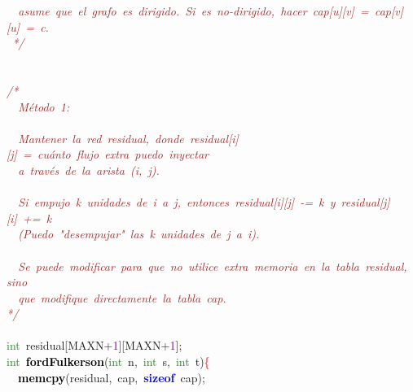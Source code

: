 {{\mbox{}\textit{\textcolor{Brown}{\ \ asume\ que\ el\ grafo\ es\ dirigido.\ Si\ es\ no-dirigido,\ hacer\ cap[u][v]\ =\ cap[v][u]\ =\ c.}} \\
\mbox{}\textit{\textcolor{Brown}{\ */}} \\
\mbox{} \\
\mbox{} \\
\mbox{}\textit{\textcolor{Brown}{/*}} \\
\mbox{}\textit{\textcolor{Brown}{\ \ Método\ 1:}} \\
\mbox{} \\
\mbox{}\textit{\textcolor{Brown}{\ \ Mantener\ la\ red\ residual,\ donde\ residual[i][j]\ =\ cuánto\ flujo\ extra\ puedo\ inyectar}} \\
\mbox{}\textit{\textcolor{Brown}{\ \ a\ través\ de\ la\ arista\ (i,\ j).}} \\
\mbox{} \\
\mbox{}\textit{\textcolor{Brown}{\ \ Si\ empujo\ k\ unidades\ de\ i\ a\ j,\ entonces\ residual[i][j]\ -=\ k\ y\ residual[j][i]\ +=\ k}} \\
\mbox{}\textit{\textcolor{Brown}{\ \ (Puedo\ "{}desempujar"{}\ las\ k\ unidades\ de\ j\ a\ i).}} \\
\mbox{} \\
\mbox{}\textit{\textcolor{Brown}{\ \ Se\ puede\ modificar\ para\ que\ no\ utilice\ extra\ memoria\ en\ la\ tabla\ residual,\ sino}} \\
\mbox{}\textit{\textcolor{Brown}{\ \ que\ modifique\ directamente\ la\ tabla\ cap.}} \\
\mbox{}\textit{\textcolor{Brown}{*/}} \\
\mbox{} \\
\mbox{}\textcolor{ForestGreen}{int}\ residual\textcolor{BrickRed}{[}MAXN\textcolor{BrickRed}{+}\textcolor{Purple}{1}\textcolor{BrickRed}{][}MAXN\textcolor{BrickRed}{+}\textcolor{Purple}{1}\textcolor{BrickRed}{];} \\
\mbox{}\textcolor{ForestGreen}{int}\ \textbf{\textcolor{Black}{fordFulkerson}}\textcolor{BrickRed}{(}\textcolor{ForestGreen}{int}\ n\textcolor{BrickRed}{,}\ \textcolor{ForestGreen}{int}\ s\textcolor{BrickRed}{,}\ \textcolor{ForestGreen}{int}\ t\textcolor{BrickRed}{)}\textcolor{Red}{\{} \\
\mbox{}\ \ \textbf{\textcolor{Black}{memcpy}}\textcolor{BrickRed}{(}residual\textcolor{BrickRed}{,}\ cap\textcolor{BrickRed}{,}\ \textbf{\textcolor{Blue}{sizeof}}\ cap\textcolor{BrickRed}{);} \\
\mbox{} \\
}}
